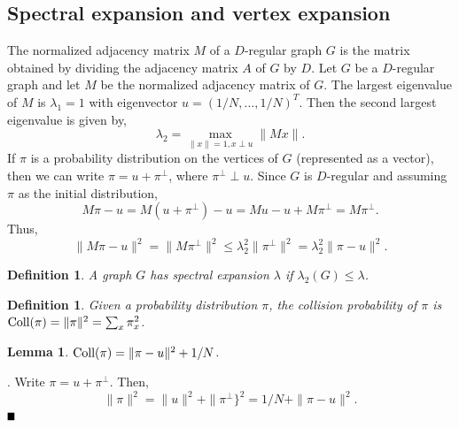 \documentclass{article}
\newtheorem{lemma}[theorem]{Lemma}
\newtheorem{definition}[theorem]{Definition}
\newcommand{\bproof}{\noindent{\bf Proof}}
\newcommand{\eproof}{\hspace*{\fill}$\rule{2mm}{2mm}$~~~~\bigskip}
\renewenvironment{proof}{\bproof. }{\eproof}
\begin{document}
\subsection{Spectral expansion and vertex expansion}
The normalized adjacency matrix $M$ of a $D$-regular graph $G$ is the matrix obtained by dividing the adjacency matrix $A$ of $G$ by $D$. Let $G$ be a $D$-regular graph and let $M$ be the normalized adjacency matrix of $G$. The largest eigenvalue of $M$ is $\lambda_1=1$ with eigenvector $u=(1/N,\ldots ,1/N)^T$. Then the second largest eigenvalue is given by,
\[
\lambda_2=\max_{\| x\| =1,x\perp u}\|Mx\|.
\]
If $\pi$ is a probability distribution on the vertices of $G$ (represented as a vector), then we can write $\pi =u+\pi^\perp$, where $\pi^\perp\perp u$. Since $G$ is $D$-regular and assuming $\pi$ as the initial distribution,
\[
M\pi -u=M(u+\pi^\perp )-u=Mu-u+M\pi^\perp =M\pi^\perp.
\]
Thus,
\[
\| M\pi-u\|^2=\| M\pi^\perp \|^2\leq \lambda _2^2\|\pi^\perp\|^2=\lambda_2^2\|\pi-u\|^2.
\]
\begin{definition}
A graph $G$ has spectral expansion $\lambda$ if $\lambda_2(G)\leq\lambda$.
\end{definition}
\begin{definition}
Given a probability distribution $\pi$, the collision probability of $\pi$ is ${\rm Coll(\pi)}=\|\pi\|^2=\sum_x\pi_x^2$.
\end{definition}
\begin{lemma}
${\rm Coll(\pi )}=\|\pi -u\|^2+1/N$.
\end{lemma}
\begin{proof}
Write $\pi =u+\pi^\perp$. Then,
\[
\|\pi\|^2=\| u\|^2+\|\pi^\perp\}^2=1/N+\|\pi -u\|^2.
\]
\end{proof}
\end{document}
